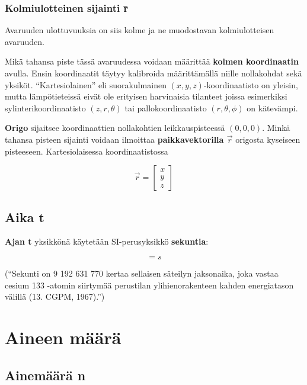 \documentclass[12pt,a4paper,finnish]{book}
\begin{document}
\subsubsection{Kolmiulotteinen sijainti \={r}}

Avaruuden ulottuvuuksia on siis kolme ja ne muodostavan kolmiulotteisen avaruuden. 

Mikä tahansa piste tässä avaruudessa voidaan määrittää \textbf{kolmen koordinaatin} avulla. 
Ensin koordinaatit täytyy kalibroida määrittämällä niille nollakohdat sekä yksiköt. ``Kartesiolainen'' eli 
suorakulmainen $(x, y, z)$-koordinaatisto on yleisin, mutta lämpötieteissä eivät ole erityisen harvinaisia tilanteet 
joissa esimerkiksi sylinterikoordinaatisto $(z, r, \theta)$ tai pallokoordinaatisto $(r, \theta, \phi)$ on kätevämpi.

\textbf{Origo} sijaitsee koordinaattien nollakohtien leikkauspisteessä $(0, 0, 0)$. Minkä tahansa pisteen sijainti 
voidaan ilmoittaa \textbf{paikkavektorilla $\vec{r}$} origosta kyseiseen pisteeseen. Kartesiolaisessa koordinaatistossa

\begin{equation}
 \vec{r} = \begin{bmatrix}
            x\\ y\\ z
           \end{bmatrix}
\end{equation}

\subsection{Aika t}

\textbf{Ajan t} yksikkönä käytetään SI-perusyksikkö \textbf{sekuntia}:

\begin{equation}
 [t] = s
\end{equation}

(``Sekunti on 9 192 631 770 kertaa sellaisen säteilyn jaksonaika, joka vastaa cesium 133 -atomin siirtymää 
perustilan ylihienorakenteen kahden energiatason välillä (13. CGPM, 1967).'')


\section{Aineen määrä} %

\subsection{Ainemäärä n}
\end{document}
